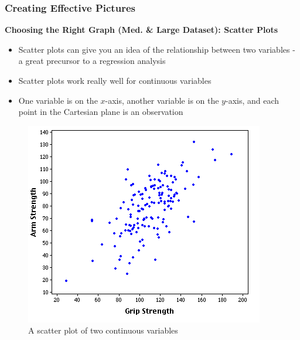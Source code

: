 \documentclass{beamer}
\begin{document}
\begin{frame}
\frametitle{Creating Effective Pictures}
\textbf{Choosing the Right Graph (Med. \& Large Dataset): Scatter Plots}\\
\vspace{0.2cm}
\begin{itemize}
\item Scatter plots can give you an idea of the relationship between two variables - a great precursor to a regression analysis
\vspace{0.2cm}
\item Scatter plots work really well for continuous variables
\vspace{0.2cm}
\item One variable is on the $x$-axis, another variable is on the $y$-axis, and each point in the Cartesian plane is an observation
\end{itemize}
\begin{figure}
\includegraphics[scale=0.3]{scatter}
\vspace{-0.5cm}
\caption{A scatter plot of two continuous variables}
\end{figure}
\end{frame}
\end{document}
